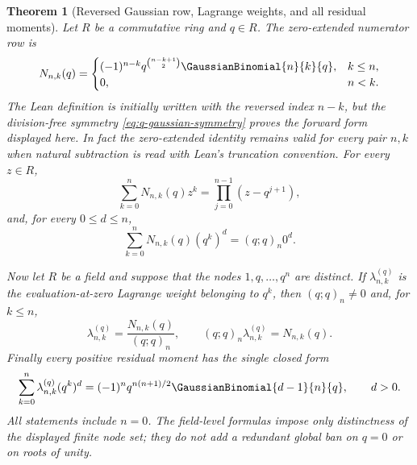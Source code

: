 \documentclass[11pt,oneside]{article}
\newtheorem{theorem}{Theorem}[section]
\theoremstyle{definition}
\theoremstyle{remark}
\begin{document}
\begin{theorem}[Reversed Gaussian row, Lagrange weights, and all residual moments]
\label{thm:geometric-q-binomial-lagrange}
Let $R$ be a commutative ring and $q\in R$.  The zero-extended numerator row is
\begin{equation}
 N_{n,k}(q)=
 \begin{cases}
 (-1)^{n-k}q^{\binom{n-k+1}{2}}\GaussianBinomial{n}{k}{q},&k\le n,\\
 0,&n<k.
 \end{cases}                                              \label{eq:geometric-q-numerator}
\end{equation}
The Lean definition is initially written with the reversed index \(n-k\),
but the division-free symmetry \eqref{eq:q-gaussian-symmetry} proves the
forward form displayed here.  In fact the zero-extended identity remains
valid for every pair \(n,k\) when natural subtraction is read with Lean's
truncation convention.  For every $z\in R$,
\begin{equation}
 \sum_{k=0}^{n}N_{n,k}(q)z^k
 =\prod_{j=0}^{n-1}(z-q^{j+1}),                           \label{eq:reversed-q-binomial}
\end{equation}
and, for every $0\le d\le n$,
\begin{equation}
 \sum_{k=0}^{n}N_{n,k}(q)(q^k)^d=(q;q)_n0^d.             \label{eq:geometric-q-numerator-moments}
\end{equation}

Now let $R$ be a field and suppose that the nodes $1,q,\ldots,q^n$ are distinct.
If $\lambda_{n,k}^{(q)}$ is the evaluation-at-zero Lagrange weight belonging to $q^k$,
then $(q;q)_n\ne0$ and, for $k\le n$,
\begin{equation}
 \lambda_{n,k}^{(q)}=\frac{N_{n,k}(q)}{(q;q)_n},
 \qquad
 (q;q)_n\lambda_{n,k}^{(q)}=N_{n,k}(q).                  \label{eq:geometric-lagrange-gaussian}
\end{equation}
Finally every positive residual moment has the single closed form
\begin{equation}
 \sum_{k=0}^{n}\lambda_{n,k}^{(q)}(q^k)^d
 =(-1)^nq^{n(n+1)/2}\GaussianBinomial{d-1}{n}{q},
 \qquad d>0.                                             \label{eq:geometric-lagrange-residual}
\end{equation}
All statements include $n=0$.  The field-level formulas impose only distinctness of the
displayed finite node set; they do not add a redundant global ban on $q=0$ or on roots of
unity.
\end{theorem}
\end{document}
